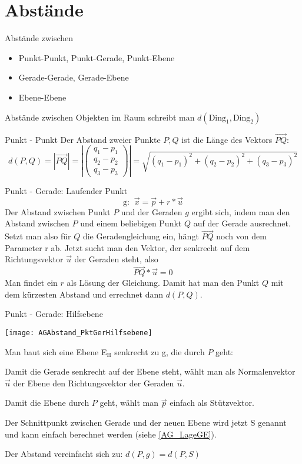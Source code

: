 \chapter{Abstände}
\begin{inhalt}
  Abstände zwischen
  \begin{itemize}
    \item Punkt-Punkt, Punkt-Gerade, Punkt-Ebene
    \item Gerade-Gerade, Gerade-Ebene
    \item Ebene-Ebene
  \end{itemize}
\end{inhalt}

Abstände zwischen Objekten im Raum schreibt man $d(\text{Ding}_1, \text{Ding}_2)$

\begin{bla}{Punkt - Punkt}
  Der Abstand zweier Punkte $P,Q$ ist die Länge des Vektors $\overrightarrow{PQ}$:
  \[
  d(P,Q)
  =
  \left| \overrightarrow{PQ} \right|
  =
  \left|\begin{pmatrix}
    q_1 - p_1 \\ q_2 - p_2 \\ q_3 - p_3
  \end{pmatrix}\right|
  =
  \sqrt{(q_1 - p_1)^2 + (q_2 - p_2)^2 + (q_3 - p_3)^2}
  \]
\end{bla}

\begin{bla}{Punkt - Gerade: Laufender Punkt}
  \[
  \text{g: }\ \vec{x} = \vec{p} + r * \vec{u}
  \]
  Der Abstand zwischen Punkt $P$ und der Geraden $g$ ergibt sich, indem man den Abstand zwischen $P$ und einem beliebigen Punkt $Q$ auf der Gerade ausrechnet.
  Setzt man also für $Q$ die Geradengleichung ein, hängt $\overrightarrow{PQ}$ noch von dem Parameter r ab.
  Jetzt sucht man den Vektor, der senkrecht auf dem Richtungsvektor $\vec{u}$ der Geraden steht, also
  \[
  \overrightarrow{PQ} * \vec{u} = 0
  \]
  Man findet ein $r$ als Lösung der Gleichung.
  Damit hat man den Punkt $Q$ mit dem kürzesten Abstand und errechnet dann $d(P,Q)$.
\end{bla}



\begin{bla}{Punkt - Gerade: Hilfsebene}
  \begin{marginfigure}[0em]
    \texttt{[image: AGAbstand\_PktGerHilfsebene]}
    \caption{Hilfsebene durch $P$, senkrecht zu Gerade g}
  \end{marginfigure}
  Man baut sich eine Ebene E$_\text{H}$ senkrecht zu g, die durch $P$ geht:

  Damit die Gerade senkrecht auf der Ebene steht, wählt man als Normalenvektor $\vec{n}$ der Ebene den Richtungsvektor der Geraden $\vec{u}$.

  Damit die Ebene durch $P$ geht, wählt man $\vec{p}$ einfach als Stützvektor.

  Der Schnittpunkt zwischen Gerade und der neuen Ebene wird jetzt S genannt und kann einfach berechnet werden (siehe \ref{AG_LageGE}).

  Der Abstand vereinfacht sich zu:
  $d(P,g) = d(P,S)$
\end{bla}


